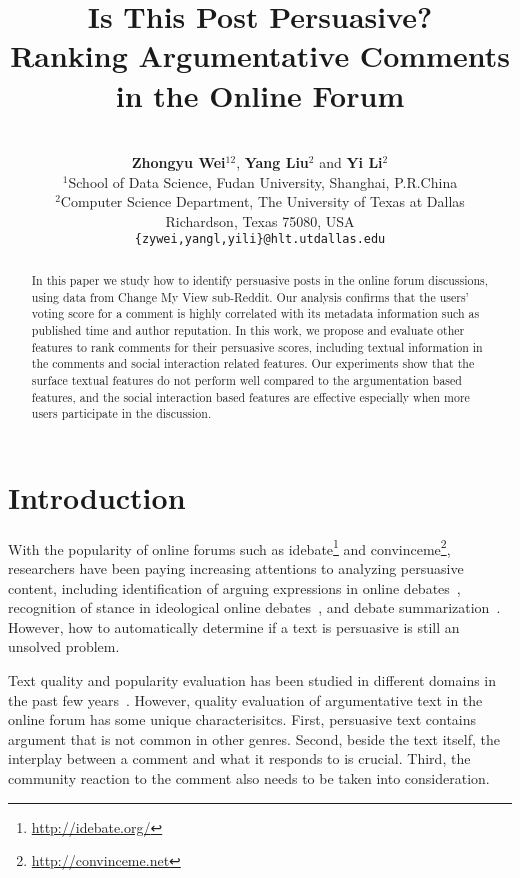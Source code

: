 \documentclass[11pt]{article}
\title{Is This Post Persuasive? \\Ranking Argumentative Comments in the Online Forum}
\author{\\ \textbf{Zhongyu Wei$^{12}$}, \textbf{Yang Liu$^{2}$} and \textbf{Yi Li$^{2}$} \\
$^1$School of Data Science, Fudan University, Shanghai, P.R.China\\
$^2$Computer Science Department, The University of Texas at Dallas\\
Richardson, Texas 75080, USA\\
 {\tt \{zywei,yangl,yili\}@hlt.utdallas.edu}
 }
\date{}
\begin{document}
\maketitle

\begin{abstract}
In this paper we study how to identify persuasive posts in the online forum discussions, using data from Change My View sub-Reddit. Our analysis confirms that the users' voting score for a comment is highly correlated with its metadata information such as published time and author reputation. In this work, we propose and evaluate other features to rank comments for their persuasive scores, including textual information in the comments and social interaction related features. Our experiments show that the surface textual features do not perform well compared to the argumentation based features, and the social interaction based features are effective especially when more users participate in the discussion.
\end{abstract}


\section{Introduction}

With the popularity of online forums such as idebate\footnote{\url{http://idebate.org/}} and convinceme\footnote{\url{http://convinceme.net}}, researchers have been paying increasing attentions to analyzing persuasive content, including identification of arguing expressions in online debates~\cite{trabelsi2014finding}, recognition of stance in ideological online debates~\cite{somasundaran2010recognizing,hasan2014you,ranade2013stance}, and 
debate summarization~\cite{ranade2013online}. However, how to automatically determine if a text is persuasive is still an unsolved problem. 

Text quality and popularity evaluation has been studied in different domains in the past few years~\cite{louis2013makes,tan2014effect,park2016supporting,guerini2015echoes}. However, quality evaluation of argumentative text in the online forum has some unique characterisitcs. First, persuasive text contains argument that is not common in other genres. Second, beside the text itself, the interplay between a comment and what it responds to is crucial. Third, the community reaction to the comment also needs to be taken into consideration. 
\end{document}
